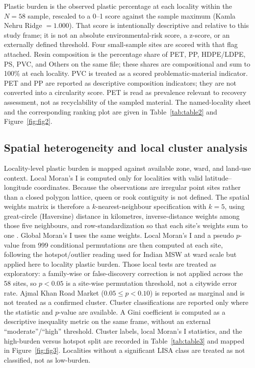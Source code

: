 \documentclass[12pt,a4paper]{article}
\begin{document}
Plastic burden is the observed plastic percentage at each locality within the $N=58$ sample, rescaled to a 0--1 score against the sample maximum (Kamla Nehru Ridge $=1.000$). That score is intentionally descriptive and relative to this study frame; it is not an absolute environmental-risk score, a z-score, or an externally defined threshold. Four small-sample sites are scored with that flag attached. Resin composition is the percentage share of PET, PP, HDPE/LDPE, PS, PVC, and Others on the same file; these shares are compositional and sum to 100\% at each locality. PVC is treated as a scored problematic-material indicator. PET and PP are reported as descriptive composition indicators; they are not converted into a circularity score. PET is read as prevalence relevant to recovery assessment, not as recyclability of the sampled material. The named-locality sheet and the corresponding ranking plot are given in Table~\ref{tab:table2} and Figure~\ref{fig:fig2}.

\subsection{Spatial heterogeneity and local cluster analysis}

Locality-level plastic burden is mapped against available zone, ward, and land-use context. Local Moran's I is computed only for localities with valid latitude--longitude coordinates. Because the observations are irregular point sites rather than a closed polygon lattice, queen or rook contiguity is not defined. The spatial weights matrix is therefore a $k$-nearest-neighbour specification with $k=5$, using great-circle (Haversine) distance in kilometres, inverse-distance weights among those five neighbours, and row-standardization so that each site's weights sum to one \citep{anselin_lisa_1995}. Global Moran's I uses the same weights. Local Moran's I and a pseudo $p$-value from 999 conditional permutations are then computed at each site, following the hotspot/outlier reading used for Indian MSW at ward scale \citep{getis_ord_1992,ieam_kota_landuse_msw_2026} but applied here to locality plastic burden. Those local tests are treated as exploratory: a family-wise or false-discovery correction is not applied across the 58 sites, so $p<0.05$ is a site-wise permutation threshold, not a citywide error rate. Ajmal Khan Road Market ($0.05\leq p<0.10$) is reported as marginal and is not treated as a confirmed cluster. Cluster classifications are reported only where the statistic and $p$-value are available. A Gini coefficient is computed as a descriptive inequality metric on the same frame, without an external ``moderate''/``high'' threshold. Cluster labels, local Moran's I statistics, and the high-burden versus hotspot split are recorded in Table~\ref{tab:table3} and mapped in Figure~\ref{fig:fig3}. Localities without a significant LISA class are treated as not classified, not as low-burden.
\end{document}
